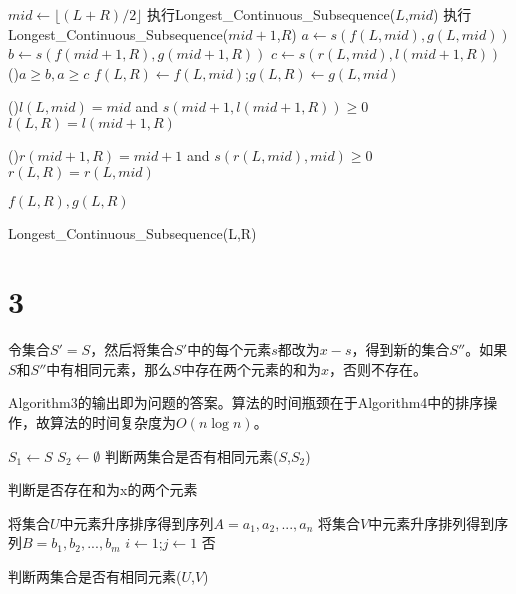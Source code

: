 \documentclass{ctexart}
\begin{document}
\begin{algorithm}[H]
  \SetAlgoLined
  $mid\leftarrow \lfloor (L+R)/2 \rfloor $   
  执行Longest\_Continuous\_Subsequence($L$,$mid$)\; 
  执行Longest\_Continuous\_Subsequence($mid+1$,$R$)\;
  $a\leftarrow s(f(L,mid),g(L,mid))$\;
  $b\leftarrow s(f(mid+1,R),g(mid+1,R))$\;
  $c\leftarrow s(r(L,mid),l(mid+1,R))$\;
  \uIf(){$a\ge b,a\ge c$}{
    $f(L,R)\leftarrow f(L,mid)$;$g(L,R)\leftarrow g(L,mid)$  \;
  }
  
  \uIf(){$l(L,mid)=mid$ and $s(mid+1,l(mid+1,R)) \ge 0 $}{
    $l(L,R) = l(mid+1,R)$
  }
  
  \uIf(){$r(mid+1,R)=mid+1$ and $s(r(L,mid),mid) \ge 0 $}{
    $r(L,R) = r(L,mid)$
  }
  
  
  
  \Return $f(L,R),g(L,R)$
  \caption{Longest\_Continuous\_Subsequence(L,R)}
\end{algorithm}


\section*{3}
令集合$S'=S$，然后将集合$S'$中的每个元素$s$都改为$x-s$，得到新的集合$S''$。如果$S$和$S''$中有相同元素，那么$S$中存在两个元素的和为$x$，否则不存在。

Algorithm3的输出即为问题的答案。算法的时间瓶颈在于Algorithm4中的排序操作，故算法的时间复杂度为$O(n\log n)$。



\begin{algorithm}[H]
  \SetAlgoLined
  $S_1 \leftarrow S$\;
  $S_2 \leftarrow \emptyset $\;
  \Return 判断两集合是否有相同元素($S$,$S_2$)

  \caption{判断是否存在和为x的两个元素}
\end{algorithm}


\begin{algorithm}[H]
  \SetAlgoLined
  将集合$U$中元素升序排序得到序列$A=a_1,a_2,...,a_n$\;
  将集合$V$中元素升序排列得到序列$B=b_1,b_2,...,b_m$\;
  $i\leftarrow 1$;$j \leftarrow 1$\;
  \Return 否
  
  \caption{判断两集合是否有相同元素($U$,$V$)}
\end{algorithm}
\end{document}
